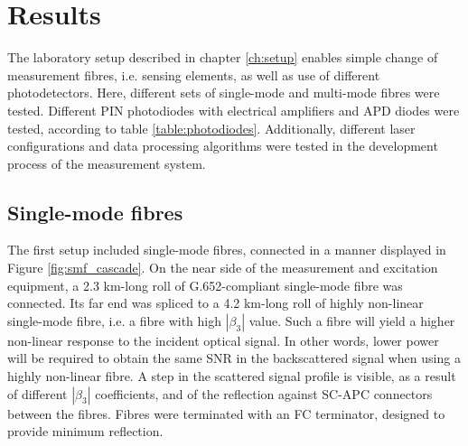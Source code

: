\documentclass{standalone}
\begin{document}
\chapter{Results} \label{ch:results}
\setcounter{page}\thestranica


The laboratory setup described in chapter \ref{ch:setup} enables simple change of measurement fibres, i.e. sensing elements, as well as use of different photodetectors. Here, different sets of single-mode and multi-mode fibres were tested. Different PIN photodiodes with electrical amplifiers and APD diodes were tested, according to table \ref{table:photodiodes}. Additionally, different laser configurations and data processing algorithms were tested in the development process of the measurement system.

\section{Single-mode fibres}

The first setup included single-mode fibres, connected in a manner displayed in Figure \ref{fig:smf_cascade}.
On the near side of the measurement and excitation equipment, a 2.3 km-long roll of G.652-compliant single-mode fibre was connected. Its far end was spliced to a 4.2 km-long roll of highly non-linear single-mode fibre, i.e. a fibre with high $\left|\beta_3\right|$ value. Such a fibre will yield a higher non-linear response to the incident optical signal. In other words, lower power will be required to obtain the same SNR in the backscattered signal when using a highly non-linear fibre. A step in the scattered signal profile is visible, as a result of different $\left|\beta_3\right|$ coefficients, and of the reflection against SC-APC connectors between the fibres. Fibres were terminated with an FC terminator, designed to provide minimum reflection. \\
\end{document}
